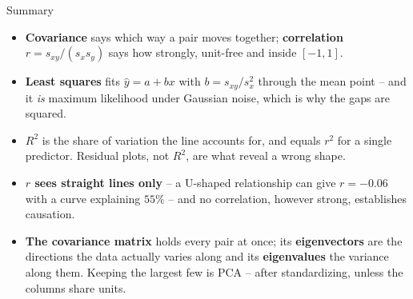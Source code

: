 \begin{frame}{Summary}
\begin{itemize}
  \item \textbf{Covariance} says which way a pair moves together; \textbf{correlation} $r = s_{xy}/(s_x s_y)$ says how strongly, unit-free and inside $[-1,1]$.
  \pause
  \item \textbf{Least squares} fits $\hat{y} = a + bx$ with $b = s_{xy}/s_x^2$ through the mean point -- and it \emph{is} maximum likelihood under Gaussian noise, which is why the gaps are squared.
  \pause
  \item \textbf{$R^2$} is the share of variation the line accounts for, and equals $r^2$ for a single predictor. Residual plots, not $R^2$, are what reveal a wrong shape.
  \pause
  \item \textbf{$r$ sees straight lines only} -- a U-shaped relationship can give $r = -0.06$ with a curve explaining $55\%$ -- and no correlation, however strong, establishes causation.
  \pause
  \item \textbf{The covariance matrix} holds every pair at once; its \textbf{eigenvectors} are the directions the data actually varies along and its \textbf{eigenvalues} the variance along them. Keeping the largest few is PCA -- after standardizing, unless the columns share units.
\end{itemize}
\end{frame}
